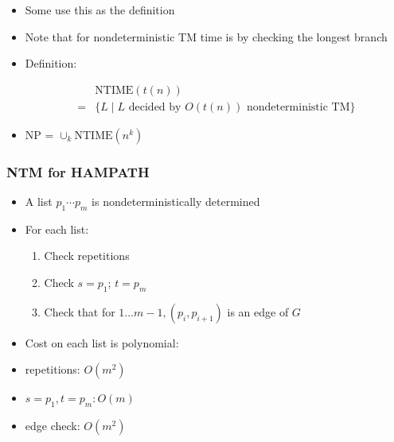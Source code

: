 \begin{frame}[allowframebreaks]
\begin{itemize}
\item Some use this as the definition

\item Note that for nondeterministic TM time is by checking the longest branch

\item Definition:

  \begin{equation*}
    \begin{split}
      & \text{NTIME}(t(n)) \\
      =& \{L\mid L
\text{ decided by } O(t(n))
\text{ nondeterministic TM}\}
\end{split}
\end{equation*}
\item NP = $\cup_k \text{NTIME}(n^k)$

\end{itemize}\end{frame} \begin{frame}[allowframebreaks] \frametitle{NTM for HAMPATH}
  \begin{itemize}
\item A list $p_1\cdots p_m$ is nondeterministically determined

\item For each list:

  \begin{enumerate}
  \item  Check repetitions
  \item Check $s=p_1$; $t=p_m$
\item Check that for $1 \ldots m-1, (p_i, p_{i+1})$ is an edge of $G$
  \end{enumerate}
\item Cost on each list is polynomial:

  
\item [] repetitions: $O(m^2)$

\item [] $s=p_1, t = p_m: O(m)$

\item [] edge check: $O(m^2)$

\end{itemize}\end{frame}

